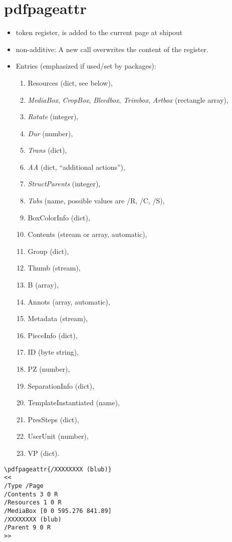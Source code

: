 \documentclass{article}
\begin{document}
\section{pdfpageattr}
\begin{itemize}
\item token register, is added to the current page at shipout
\item non-additive: A new call overwrites the content of the register.
\item Entries (emphasized if used/set by packages):
   \begin{enumerate}
    \item Resources (dict, see below),
    \item \emph{MediaBox}, \emph{CropBox}, \emph{Bleedbox}, \emph{Trimbox}, \emph{Artbox} (rectangle array),
    \item \emph{Rotate} (integer),
    \item \emph{Dur} (number),
    \item \emph{Trans} (dict),
    \item \emph{AA} (dict, \enquote{additional actions}),
    \item \emph{StructParents} (integer),
    \item \emph{Tabs} (name, possible values are /R, /C, /S),
    \item BoxColorInfo (dict),
    \item Contents (stream or array, automatic),
    \item Group (dict),
    \item Thumb (stream),
    \item B (array),
    \item Annots (array, automatic),
    \item Metadata (stream),
    \item PieceInfo (dict),
    \item ID (byte string),
    \item PZ (number),
    \item SeparationInfo (dict),
    \item TemplateInstantiated (name),
    \item PresSteps (dict),
    \item UserUnit (number),
    \item VP (dict).
    \end{enumerate}
   \end{itemize}
\begin{verbatim}
\pdfpageattr{/XXXXXXXX (blub)}
<<
/Type /Page
/Contents 3 0 R
/Resources 1 0 R
/MediaBox [0 0 595.276 841.89]
/XXXXXXXX (blub)
/Parent 9 0 R
>>
\end{verbatim}
\end{document}
